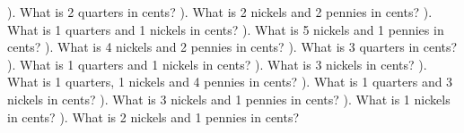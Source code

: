 \documentclass{article}%
\begin{document}
\newline%
\newline%
). What is 2 quarters in cents?%
\newline%
\newline%
). What is 2 nickels and 2 pennies in cents?%
\newline%
\newline%
). What is 1 quarters and 1 nickels in cents?%
\newline%
\newline%
). What is 5 nickels and 1 pennies in cents?%
\newline%
\newline%
). What is 4 nickels and 2 pennies in cents?%
\newline%
\newline%
). What is 3 quarters in cents?%
\newline%
\newline%
). What is 1 quarters and 1 nickels in cents?%
\newline%
\newline%
). What is 3 nickels in cents?%
\newline%
\newline%
). What is 1 quarters, 1 nickels and 4 pennies in cents?%
\newline%
\newline%
). What is 1 quarters and 3 nickels in cents?%
\newline%
\newline%
). What is 3 nickels and 1 pennies in cents?%
\newline%
\newline%
). What is 1 nickels in cents?%
\newline%
\newline%
). What is 2 nickels and 1 pennies in cents?%
\newline%
\newline%
\end{document}
